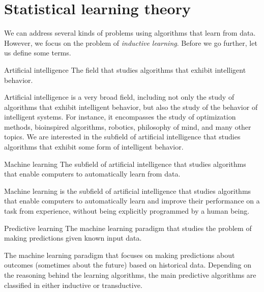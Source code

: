 \chapter{Statistical learning theory}
\label{chap:slt}


We can address several kinds of problems using algorithms that learn from data.  However,
we focus on the problem of \emph{inductive learning}. Before we go further, let us define some terms.

\begin{defbox}{Artificial intelligence}{}
  The field that studies algorithms that exhibit intelligent behavior.
\end{defbox}

Artificial intelligence is a very broad field, including not only the study of algorithms
that exhibit intelligent behavior, but also the study of the behavior of intelligent
systems.  For instance, it encompasses the study of optimization methods, bioinspired algorithms,
robotics, philosophy of mind, and many other topics.  We are interested in the subfield of
artificial intelligence that studies algorithms that exhibit some form of intelligent
behavior.

\begin{defbox}{Machine learning}{}
  The subfield of artificial intelligence that studies algorithms that enable computers to
  automatically learn from data.
\end{defbox}

Machine learning is the subfield of artificial intelligence that studies algorithms that
enable computers to automatically learn and improve their performance on a task from
experience, without being explicitly programmed by a human being.

\begin{defbox}{Predictive learning}{}
  The machine learning paradigm that studies the problem of making predictions given known
  input data.
\end{defbox}

The machine learning paradigm that focuses on making predictions about outcomes (sometimes
about the future) based on historical data. Depending on the reasoning behind the learning
algorithms, the main predictive algorithms are classified in either inductive or
transductive.

